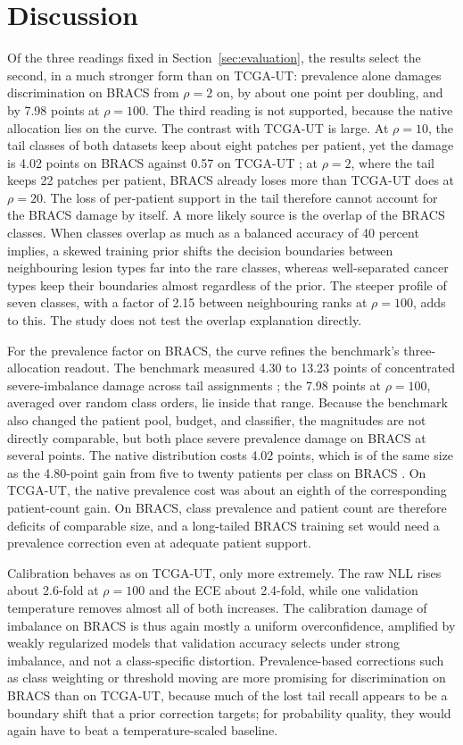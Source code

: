 \section{Discussion}
\label{sec:discussion}
Of the three readings fixed in Section~\ref{sec:evaluation}, the results select the second, in a much stronger form than on TCGA-UT: prevalence alone damages discrimination on BRACS from $\rho=2$ on, by about one point per doubling, and by 7.98 points at $\rho=100$. The third reading is not supported, because the native allocation lies on the curve. The contrast with TCGA-UT is large. At $\rho=10$, the tail classes of both datasets keep about eight patches per patient, yet the damage is 4.02 points on BRACS against 0.57 on TCGA-UT \citep{queisler2026prevalenceTcga}; at $\rho=2$, where the tail keeps 22 patches per patient, BRACS already loses more than TCGA-UT does at $\rho=20$. The loss of per-patient support in the tail therefore cannot account for the BRACS damage by itself. A more likely source is the overlap of the BRACS classes. When classes overlap as much as a balanced accuracy of 40 percent implies, a skewed training prior shifts the decision boundaries between neighbouring lesion types far into the rare classes, whereas well-separated cancer types keep their boundaries almost regardless of the prior. The steeper profile of seven classes, with a factor of 2.15 between neighbouring ranks at $\rho=100$, adds to this. The study does not test the overlap explanation directly.

For the prevalence factor on BRACS, the curve refines the benchmark's three-allocation readout. The benchmark measured 4.30 to 13.23 points of concentrated severe-imbalance damage across tail assignments \citep{queisler2026benchmarkResults}; the 7.98 points at $\rho=100$, averaged over random class orders, lie inside that range. Because the benchmark also changed the patient pool, budget, and classifier, the magnitudes are not directly comparable, but both place severe prevalence damage on BRACS at several points. The native distribution costs 4.02 points, which is of the same size as the 4.80-point gain from five to twenty patients per class on BRACS \citep{queisler2026bracsMechanism}. On TCGA-UT, the native prevalence cost was about an eighth of the corresponding patient-count gain. On BRACS, class prevalence and patient count are therefore deficits of comparable size, and a long-tailed BRACS training set would need a prevalence correction even at adequate patient support.

Calibration behaves as on TCGA-UT, only more extremely. The raw NLL rises about 2.6-fold at $\rho=100$ and the ECE about 2.4-fold, while one validation temperature removes almost all of both increases. The calibration damage of imbalance on BRACS is thus again mostly a uniform overconfidence, amplified by weakly regularized models that validation accuracy selects under strong imbalance, and not a class-specific distortion. Prevalence-based corrections such as class weighting or threshold moving \citep{buda2018systematic} are more promising for discrimination on BRACS than on TCGA-UT, because much of the lost tail recall appears to be a boundary shift that a prior correction targets; for probability quality, they would again have to beat a temperature-scaled baseline.

